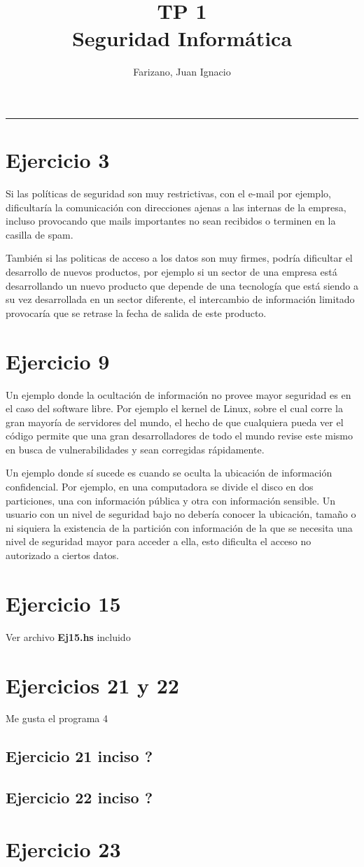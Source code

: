 \documentclass[11pt]{article}
\title{
    TP 1 \\
    \large Seguridad Informática}
\author{Farizano, Juan Ignacio}
\date{}
\begin{document}
\maketitle

\rule{\textwidth}{1pt}

\section*{Ejercicio 3}
Si las políticas de seguridad son muy restrictivas, con el e-mail por ejemplo, dificultaría
la comunicación con direcciones ajenas a las internas de la empresa, incluso provocando
que mails importantes no sean recibidos o terminen en la casilla de spam.

También si las politicas de acceso a los datos son muy firmes, podría dificultar
el desarrollo de nuevos productos, por ejemplo si un sector de una empresa está
desarrollando un nuevo producto que depende de una tecnología que está siendo 
a su vez desarrollada en un sector diferente, el intercambio de información limitado
provocaría que se retrase la fecha de salida de este producto.


\section*{Ejercicio 9}
Un ejemplo donde la ocultación de información no provee mayor seguridad es en el 
caso del software libre. Por ejemplo el kernel de Linux, sobre el cual corre la gran
mayoría de servidores del mundo, el hecho de que cualquiera pueda ver el código
permite que una gran desarrolladores de todo el mundo revise este mismo en busca
de vulnerabilidades y sean corregidas rápidamente.

Un ejemplo donde sí sucede es cuando se oculta la ubicación de información
confidencial. Por ejemplo, en una computadora se divide el disco en dos particiones,
una con información pública y otra con información sensible. Un usuario con un 
nivel de seguridad bajo no debería conocer la ubicación, tamaño o ni siquiera la
existencia de la partición con información de la que se necesita una nivel de seguridad
mayor para acceder a ella, esto dificulta el acceso no autorizado a ciertos datos.

\section*{Ejercicio 15}
Ver archivo \textbf{Ej15.hs} incluido

\section*{Ejercicios 21 y 22}
Me gusta el programa 4
\subsection*{Ejercicio 21 inciso ?}
\subsection*{Ejercicio 22 inciso ?}

\section*{Ejercicio 23}
\end{document}
